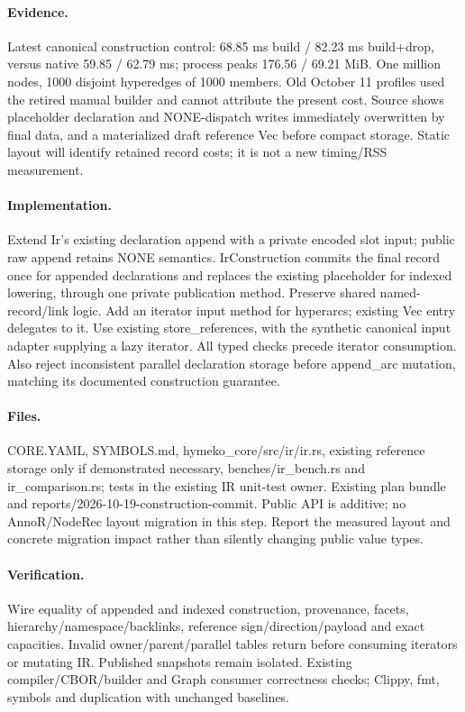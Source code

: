 \documentclass[11pt,a4paper]{article}
\begin{document}
\paragraph{Evidence.} Latest canonical construction control: 68.85 ms build / 82.23 ms
build+drop, versus native 59.85 / 62.79 ms; process peaks 176.56 / 69.21 MiB. One million
nodes, 1000 disjoint hyperedges of 1000 members. Old October 11 profiles used the retired
manual builder and cannot attribute the present cost. Source shows placeholder declaration
and NONE-dispatch writes immediately overwritten by final data, and a materialized draft
reference Vec before compact storage. Static layout will identify retained record costs;
it is not a new timing/RSS measurement.
\paragraph{Implementation.} Extend Ir's existing declaration append with a private encoded
slot input; public raw append retains NONE semantics. IrConstruction commits the final
record once for appended declarations and replaces the existing placeholder for indexed
lowering, through one private publication method. Preserve shared named-record/link logic.
Add an iterator input method for hyperarcs; existing Vec entry delegates to it. Use existing
store\_references, with the synthetic canonical input adapter supplying a lazy iterator.
All typed checks precede iterator consumption. Also reject inconsistent parallel declaration
storage before append\_arc mutation, matching its documented construction guarantee.
\paragraph{Files.} CORE.YAML, SYMBOLS.md, hymeko\_core/src/ir/ir.rs, existing reference
storage only if demonstrated necessary, benches/ir\_bench.rs and ir\_comparison.rs; tests in
the existing IR unit-test owner. Existing plan bundle and reports/2026-10-19-construction-commit.
Public API is additive; no AnnoR/NodeRec layout migration in this step. Report the measured
layout and concrete migration impact rather than silently changing public value types.
\paragraph{Verification.} Wire equality of appended and indexed construction, provenance,
facets, hierarchy/namespace/backlinks, reference sign/direction/payload and exact capacities.
Invalid owner/parent/parallel tables return before consuming iterators or mutating IR.
Published snapshots remain isolated. Existing compiler/CBOR/builder and Graph consumer
correctness checks; Clippy, fmt, symbols and duplication with unchanged baselines.
\end{document}
